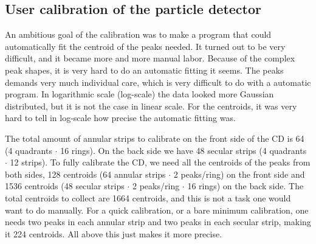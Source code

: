 \documentclass[twoside,english]{uiofysmaster/uiofysmaster}
\begin{document}
\subsection{User calibration of the particle detector}
An ambitious goal of the calibration was to make a program that could automatically fit the centroid of the peaks needed. 
It turned out to be very difficult, and it became more and more manual labor. 
Because of the complex peak shapes, it is very hard to do an automatic fitting it seems. 
The peaks demands very much individual care, which is very difficult to do with a automatic program. 
In logarithmic scale (log-scale) the data looked more Gaussian distributed, but it is not the case in linear scale. 
For the centroids, it was very hard to tell in log-scale how precise the automatic fitting was. 

The total amount of annular strips to calibrate on the front side of the CD is 64 (4 quadrants $\cdot$ 16 rings). 
On the back side we have 48 secular strips (4 quadrants $\cdot$ 12 strips). 
To fully calibrate the CD, we need all the centroids of the peaks from both sides, 128 centroids (64 annular strips $\cdot$ 2 peaks/ring) on the front side and 1536 centroids (48 secular strips $\cdot$ 2 peaks/ring $\cdot$ 16 rings) on the back side. 
The total centroids to collect are 1664 centroids, and this is not a task one would want to do manually.
For a quick calibration, or a bare minimum calibration, one needs two peaks in each annular strip and two peaks in each secular strip, making it 224 centroids.
All above this just makes it more precise.
\end{document}
